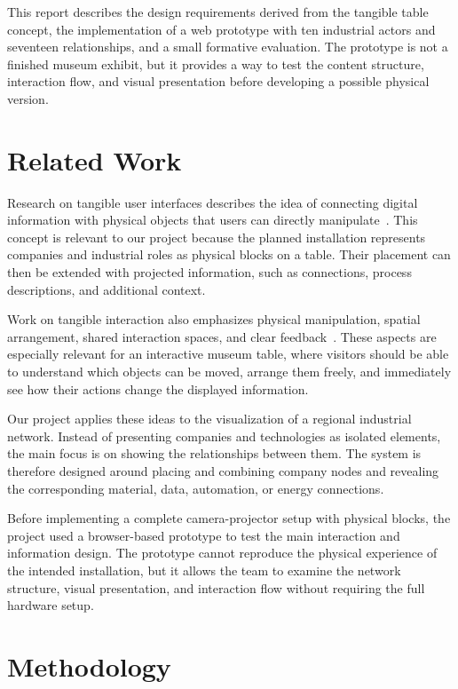 \documentclass[sigconf,nonacm]{acmart}
\begin{document}
This report describes the design requirements derived from the tangible table concept, the implementation of a web prototype with ten industrial actors and seventeen relationships, and a small formative evaluation. The prototype is not a finished museum exhibit, but it provides a way to test the content structure, interaction flow, and visual presentation before developing a possible physical version.

\section{Related Work}

Research on tangible user interfaces describes the idea of connecting digital information with physical objects that users can directly manipulate~\cite{ishii1997}. This concept is relevant to our project because the planned installation represents companies and industrial roles as physical blocks on a table. Their placement can then be extended with projected information, such as connections, process descriptions, and additional context.

Work on tangible interaction also emphasizes physical manipulation, spatial arrangement, shared interaction spaces, and clear feedback~\cite{hornecker2006}. These aspects are especially relevant for an interactive museum table, where visitors should be able to understand which objects can be moved, arrange them freely, and immediately see how their actions change the displayed information.

Our project applies these ideas to the visualization of a regional industrial network. Instead of presenting companies and technologies as isolated elements, the main focus is on showing the relationships between them. The system is therefore designed around placing and combining company nodes and revealing the corresponding material, data, automation, or energy connections.

Before implementing a complete camera-projector setup with physical blocks, the project used a browser-based prototype to test the main interaction and information design. The prototype cannot reproduce the physical experience of the intended installation, but it allows the team to examine the network structure, visual presentation, and interaction flow without requiring the full hardware setup.

\section{Methodology}
\end{document}
